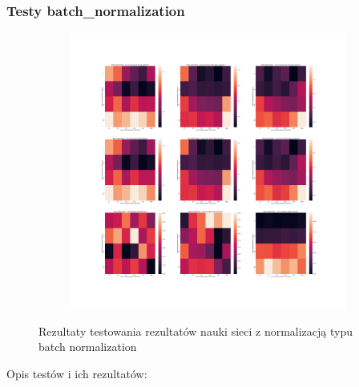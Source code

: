 \documentclass[12pt]{article}
\begin{document}
\subsubsection{Testy batch\_normalization}
\begin{figure}[h!]
	\centering
	\begin{subfigure}[b]{1\linewidth}
		\includegraphics[width=\linewidth]{Comparision_batch_norm.png}
	\end{subfigure}
	\label{fig:batch}
	\caption{Rezultaty testowania rezultatów nauki sieci z normalizacją typu batch normalization}
\end{figure}
Opis testów i ich rezultatów:
\end{document}

